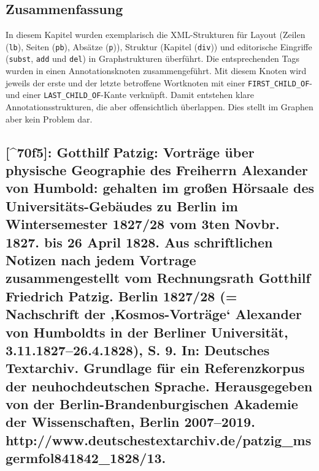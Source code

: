 \documentclass[12pt,ngerman,]{article}
\begin{document}
\subsection{Zusammenfassung}\label{zusammenfassung-6}

In diesem Kapitel wurden exemplarisch die XML-Strukturen für Layout
(Zeilen (\texttt{lb}), Seiten (\texttt{pb}), Absätze (\texttt{p})),
Struktur (Kapitel (\texttt{div})) und editorische Eingriffe
(\texttt{subst}, \texttt{add} und \texttt{del}) in Graphstrukturen
überführt. Die entsprechenden Tags wurden in einen Annotationsknoten
zusammengeführt. Mit diesem Knoten wird jeweils der erste und der letzte
betroffene Wortknoten mit einer \texttt{FIRST\_CHILD\_OF}- und einer
\texttt{LAST\_CHILD\_OF}-Kante verknüpft. Damit entstehen klare
Annotationsstrukturen, die aber offensichtlich überlappen. Dies stellt
im Graphen aber kein Problem dar.

\subsection{{[}\^{}70f5{]}: Gotthilf Patzig: Vorträge über physische
Geographie des Freiherrn Alexander von Humbold: gehalten im großen
Hörsaale des Universitäts-Gebäudes zu Berlin im Wintersemester 1827/28
vom 3ten Novbr. 1827. bis 26 April 1828. Aus schriftlichen Notizen nach
jedem Vortrage zusammengestellt vom Rechnungsrath Gotthilf Friedrich
Patzig. Berlin 1827/28 (= Nachschrift der ‚Kosmos-Vorträge` Alexander
von Humboldts in der Berliner Universität, 3.11.1827--26.4.1828), S. 9.
In: Deutsches Textarchiv. Grundlage für ein Referenzkorpus der
neuhochdeutschen Sprache. Herausgegeben von der Berlin-Brandenburgischen
Akademie der Wissenschaften, Berlin 2007--2019.
http://www.deutschestextarchiv.de/patzig\_msgermfol841842\_1828/13.}\label{f5-gotthilf-patzig-vortruxe4ge-uxfcber-physische-geographie-des-freiherrn-alexander-von-humbold-gehalten-im-grouxdfen-huxf6rsaale-des-universituxe4ts-gebuxe4udes-zu-berlin-im-wintersemester-182728-vom-3ten-novbr.-1827.-bis-26-april-1828.-aus-schriftlichen-notizen-nach-jedem-vortrage-zusammengestellt-vom-rechnungsrath-gotthilf-friedrich-patzig.-berlin-182728-nachschrift-der-kosmos-vortruxe4ge-alexander-von-humboldts-in-der-berliner-universituxe4t-3.11.182726.4.1828-s.-9.-in-deutsches-textarchiv.-grundlage-fuxfcr-ein-referenzkorpus-der-neuhochdeutschen-sprache.-herausgegeben-von-der-berlin-brandenburgischen-akademie-der-wissenschaften-berlin-20072019.-httpwww.deutschestextarchiv.depatzig_msgermfol841842_182813.}
\end{document}
